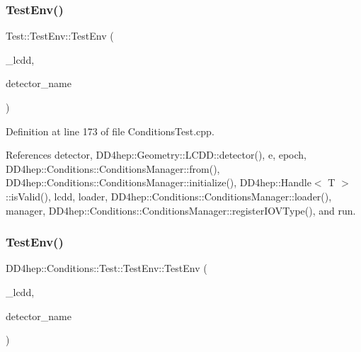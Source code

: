 \subsubsection{\texorpdfstring{Test\+Env()}{TestEnv()}\hspace{0.1cm}{\footnotesize\ttfamily [1/2]}}
{\footnotesize\ttfamily Test\+::\+Test\+Env\+::\+Test\+Env (\begin{DoxyParamCaption}\item[{\hyperlink{class_d_d4hep_1_1_geometry_1_1_l_c_d_d}{L\+C\+DD} \&}]{\+\_\+lcdd,  }\item[{const std\+::string \&}]{detector\+\_\+name }\end{DoxyParamCaption})}



Definition at line 173 of file Conditions\+Test.\+cpp.



References detector, D\+D4hep\+::\+Geometry\+::\+L\+C\+D\+D\+::detector(), e, epoch, D\+D4hep\+::\+Conditions\+::\+Conditions\+Manager\+::from(), D\+D4hep\+::\+Conditions\+::\+Conditions\+Manager\+::initialize(), D\+D4hep\+::\+Handle$<$ T $>$\+::is\+Valid(), lcdd, loader, D\+D4hep\+::\+Conditions\+::\+Conditions\+Manager\+::loader(), manager, D\+D4hep\+::\+Conditions\+::\+Conditions\+Manager\+::register\+I\+O\+V\+Type(), and run.

\hypertarget{struct_d_d4hep_1_1_conditions_1_1_test_1_1_test_env_a65ece677c712504466503c346b7c86ec}{}\label{struct_d_d4hep_1_1_conditions_1_1_test_1_1_test_env_a65ece677c712504466503c346b7c86ec} 
\subsubsection{\texorpdfstring{Test\+Env()}{TestEnv()}\hspace{0.1cm}{\footnotesize\ttfamily [2/2]}}
{\footnotesize\ttfamily D\+D4hep\+::\+Conditions\+::\+Test\+::\+Test\+Env\+::\+Test\+Env (\begin{DoxyParamCaption}\item[{\hyperlink{class_d_d4hep_1_1_geometry_1_1_l_c_d_d}{L\+C\+DD} \&}]{\+\_\+lcdd,  }\item[{const std\+::string \&}]{detector\+\_\+name }\end{DoxyParamCaption})}



